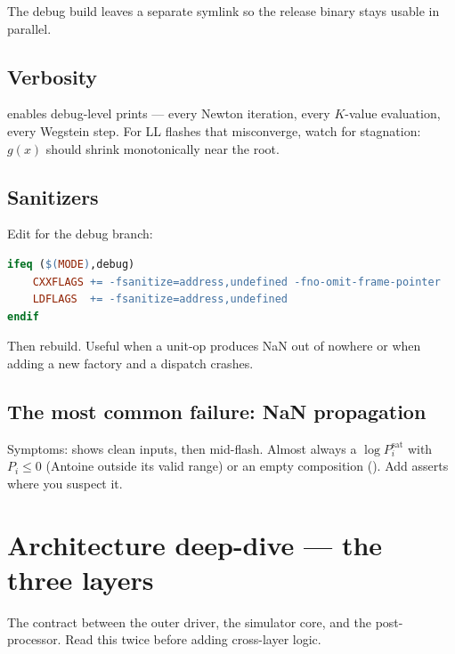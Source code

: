 \documentclass[11pt,a4paper]{article}
\begin{document}
The debug build leaves a separate symlink 
so the release binary stays usable in parallel.

\subsection{Verbosity}

 enables debug-level prints ---
every Newton iteration, every $K$-value evaluation, every Wegstein
step. For LL flashes that misconverge, watch for stagnation:
$g(x)$ should shrink monotonically near the root.

\subsection{Sanitizers}

Edit  for the debug branch:

\begin{lstlisting}[language=make]
ifeq ($(MODE),debug)
    CXXFLAGS += -fsanitize=address,undefined -fno-omit-frame-pointer
    LDFLAGS  += -fsanitize=address,undefined
endif
\end{lstlisting}

Then rebuild. Useful when a unit-op produces NaN out of nowhere or
when adding a new factory and a dispatch crashes.

\subsection{The most common failure: NaN propagation}

Symptoms:  shows clean inputs, then
 mid-flash. Almost always a $\log P_i^{\mathrm{sat}}$
with $P_i \le 0$ (Antoine outside its valid range) or an empty
composition (). Add asserts where you suspect it.

\section{Architecture deep-dive --- the three layers}\label{sec:threelayers}

\begin{whatyoulllearn}
The contract between the outer driver, the simulator core, and the
post-processor. Read this twice before adding cross-layer logic.
\end{whatyoulllearn}
\end{document}
